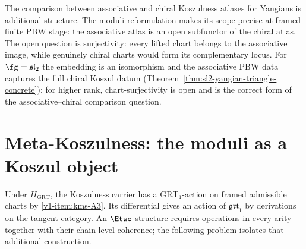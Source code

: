 \begin{remark}
\label{v1-rem:kms-fm161-closed}
The comparison between associative and chiral Koszulness atlases for
Yangians is additional structure. The moduli reformulation makes its
scope precise at framed finite PBW stage: the associative atlas
is an open subfunctor of the chiral atlas. The open question is
surjectivity: every lifted chart belongs to the associative image,
while genuinely chiral charts would form its complementary locus.
For $\fg = \mathfrak{sl}_2$ the embedding is an isomorphism and the
associative PBW data captures the full chiral Koszul datum
(Theorem~\ref{thm:sl2-yangian-triangle-concrete});
for higher rank, chart-surjectivity is open and is the
correct form of the associative--chiral comparison question.
\end{remark}

\section{Meta-Koszulness: the moduli as a Koszul object}
\label{v1-sec:kms-meta}

Under $H_{\mathrm{GRT}}$, the Koszulness carrier has a
$\mathrm{GRT}_1$-action on framed admissible charts by
\ref{v1-item:kms-A3}.  Its differential gives an action of
$\mathfrak{grt}_1$ by derivations on the tangent category.  An
$\Etwo$-structure requires operations in every arity together with
their chain-level coherence; the following problem isolates that
additional construction.

